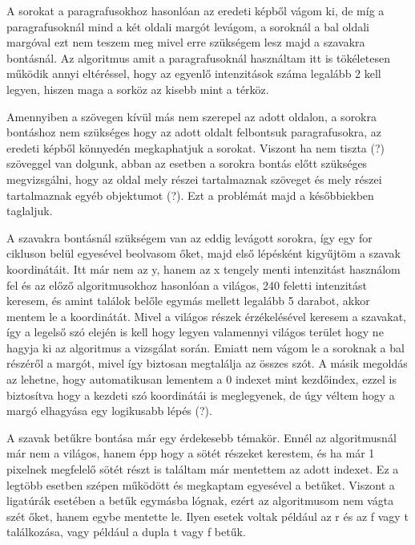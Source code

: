 A sorokat a paragrafusokhoz hasonlóan az eredeti képből vágom ki, de míg a paragrafusoknál mind a két oldali margót levágom, a soroknál a bal oldali margóval ezt nem teszem meg mivel erre szükségem lesz majd a szavakra bontásnál. Az algoritmus amit a paragrafusoknál használtam itt is tökéletesen működik annyi eltéréssel, hogy az egyenlő intenzitások száma legalább 2 kell legyen, hiszen maga a sorköz az kisebb mint a térköz.

Amennyiben a szövegen kívül más nem szerepel az adott oldalon, a sorokra bontáshoz nem szükséges hogy az adott oldalt felbontsuk paragrafusokra, az eredeti képből könnyedén megkaphatjuk a sorokat. Viszont ha nem tiszta (?) szöveggel van dolgunk, abban az esetben a sorokra bontás előtt szükséges megvizsgálni, hogy az oldal mely részei tartalmaznak szöveget és mely részei tartalmaznak egyéb objektumot (?). Ezt a problémát majd a későbbiekben taglaljuk.

A szavakra bontásnál szükségem van az eddig levágott sorokra, így egy for cikluson belül egyesével beolvasom őket, majd első lépésként kigyűjtöm a szavak koordinátáit. Itt már nem az y, hanem az x tengely menti intenzitást használom fel és az előző algoritmusokhoz hasonlóan a világos, 240 feletti intenzitást keresem, és amint találok belőle egymás mellett legalább 5 darabot, akkor mentem le a koordinátát. Mivel a világos részek érzékelésével keresem a szavakat, így a legelső szó elején is kell hogy legyen valamennyi világos terület hogy ne hagyja ki az algoritmus a vizsgálat során. Emiatt nem vágom le a soroknak a bal részéről a margót, mivel így biztosan megtalálja az összes szót. A másik megoldás az lehetne, hogy automatikusan lementem a 0 indexet mint kezdőindex, ezzel is biztosítva hogy a kezdeti szó koordinátái is meglegyenek, de úgy véltem hogy a margó elhagyása egy logikusabb lépés (?).

A szavak betűkre bontása már egy érdekesebb témakör. Ennél az algoritmusnál már nem a világos, hanem épp hogy a sötét részeket kerestem, és ha már 1 pixelnek megfelelő sötét részt is találtam már mentettem az adott indexet. Ez a legtöbb esetben szépen működött és megkaptam egyesével a betűket. Viszont a ligatúrák esetében a betűk egymásba lógnak, ezért az algoritmusom nem vágta szét őket, hanem egybe mentette le. Ilyen esetek voltak például az r és az f vagy t találkozása, vagy például a dupla t vagy f betűk.



